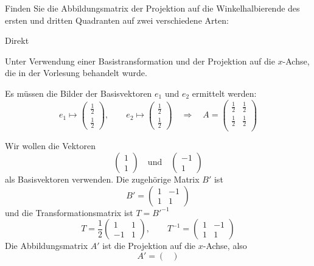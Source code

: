 Finden Sie die Abbildungsmatrix der Projektion auf die Winkelhalbierende
des ersten und dritten Quadranten auf zwei verschiedene Arten:
\begin{teilaufgaben}
\item Direkt
\item Unter Verwendung einer Basistransformation und der Projektion auf
die $x$-Achse, die in der Vorlesung behandelt wurde.
\end{teilaufgaben}


\begin{loesung}
\begin{teilaufgaben}
\item Es müssen die Bilder der Basisvektoren $e_1$ und $e_2$ ermittelt
werden:
\[
e_1\mapsto\begin{pmatrix}\frac{1}2\\\frac{1}2\end{pmatrix}
,\qquad
e_2\mapsto\begin{pmatrix}\frac{1}2\\\frac{1}2\end{pmatrix}
\quad
\Rightarrow
\quad
A=\begin{pmatrix}
\frac{1}2&
\frac{1}2\\
\frac{1}2&
\frac{1}2\\
\end{pmatrix}
\]
\item
Wir wollen die Vektoren
\[
\begin{pmatrix}1\\1\end{pmatrix}
\quad\text{und}\quad
\begin{pmatrix}-1\\1\end{pmatrix}
\]
als Basisvektoren verwenden. Die zugehörige Matrix $B'$ ist
\[
B'=
\begin{pmatrix}
1&-1\\
1&1
\end{pmatrix}
\]
und die Transformationsmatrix ist $T=B'^{-1}$
\[
T=
\frac12\begin{pmatrix}
1&1\\
-1&1
\end{pmatrix}
,\qquad
T^{-1}=
\begin{pmatrix}
1&-1\\
1&1
\end{pmatrix}
\]
Die Abbildungsmatrix $A'$ ist die Projektion auf die $x$-Achse,
also
\[
A'=
\begin{pmatrix}

\end{pmatrix}\]
\end{teilaufgaben}
\end{loesung}
